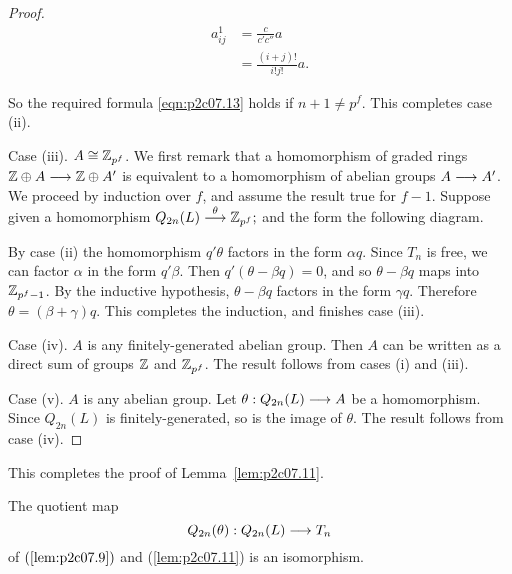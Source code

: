 \documentclass[../main]{subfiles}
\begin{document}
\begin{proof}
\begin{align*}
a_{ij}^1 & = \frac c {c' c''} a \\ & = \frac {(i + j)!} {i! j!} a.
\end{align*}

So the required formula \eqref{eqn:p2c07.13} holds if $n + 1 \ne p^f$. This completes case (ii). 

Case (iii). $A \cong \mathbb{Z}_{p^f}$. We first remark that a homomorphism of graded rings $\mathbb{Z} \oplus A \overset{}{\longrightarrow} \mathbb{Z} \oplus A'$ is equivalent to a homomorphism of abelian groups $A \overset{}{\longrightarrow} A'$. We proceed by induction over $f$, and assume the result true for $f - 1$. Suppose given a homomorphism $Q_{2n}(L) \overset{\theta}{\longrightarrow} \mathbb{Z}_{p^f};$ and the form the following diagram.

\begin{center}
\end{center}

By case (ii) the homomorphism $q'\theta$ factors in the form $\alpha q$. Since $T_n$ is free, we can factor $\alpha$ in the form $q' \beta$. Then $q'(\theta - \beta q) = 0$, and so $\theta - \beta q$ maps into $\mathbb{Z}_{p^f - 1}$. By the inductive hypothesis, $\theta - \beta q$ factors in the form $\gamma q$. Therefore $\theta = (\beta + \gamma)q$. This completes the induction, and finishes case (iii).

Case (iv). $A$ is any finitely-generated abelian group. Then $A$ can be written as a direct sum of groups $\mathbb{Z}$ and $\mathbb{Z}_{p^f}$. The result follows from cases (i) and (iii).

Case (v). $A$ is any abelian group. Let $\theta : Q_{2n}(L) \overset{}{\longrightarrow} A$ be a homomorphism. Since $Q_{2n}(L)$ is finitely-generated, so is the image of $\theta$. The result follows from case (iv).
\end{proof}

This completes the proof of Lemma~\ref{lem:p2c07.11}.

\begin{corollary}
\label{cor:p2c07.14}
The quotient map $$Q_{2n}(\theta) : Q_{2n}(L) \overset{}{\longrightarrow} T_n$$ of $(\ref{lem:p2c07.9})$ and (\ref{lem:p2c07.11}) is an isomorphism. 
\end{corollary}
\end{document}
